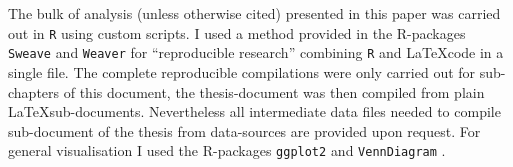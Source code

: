 The bulk of analysis (unless otherwise cited) presented in this paper
was carried out in \texttt{R} \cite{R_project} using custom scripts.
I used a method provided in the R-packages \texttt{Sweave}
\cite{lmucs-papers:Leisch:2002} and \texttt{Weaver} \cite{weaver} for
``reproducible research'' combining \texttt{R} and \LaTeX code in a
single file. The complete reproducible compilations were only carried
out for sub-chapters of this document, the thesis-document was then
compiled from plain \LaTeX sub-documents. Nevertheless all
intermediate data files needed to compile sub-document of the thesis
from data-sources are provided upon request. For general visualisation
I used the R-packages \texttt{ggplot2} \cite{ggplot-book} and
\texttt{VennDiagram} \cite{pmid21269502}.


 






